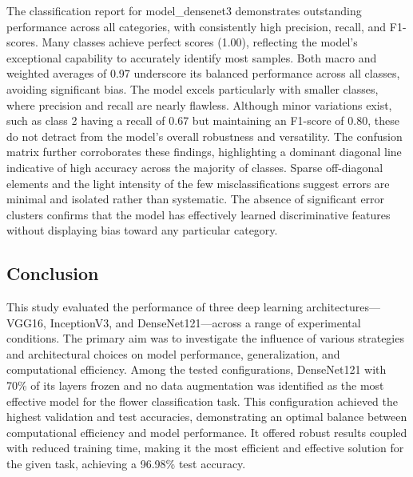 The classification report for model\_densenet3 demonstrates outstanding performance across all categories, with
consistently high precision, recall, and F1-scores. Many classes achieve perfect scores (1.00), reflecting the model's
exceptional capability to accurately identify most samples. Both macro and weighted averages of 0.97 underscore its
balanced performance across all classes, avoiding significant bias. The model excels particularly with smaller classes,
where precision and recall are nearly flawless. Although minor variations exist, such as class 2 having a recall of 0.67
but maintaining an F1-score of 0.80, these do not detract from the model's overall robustness and versatility.
The confusion matrix further corroborates these findings, highlighting a dominant diagonal line indicative of high
accuracy across the majority of classes. Sparse off-diagonal elements and the light intensity of the few misclassifications
suggest errors are minimal and isolated rather than systematic. The absence of significant error clusters confirms that
the model has effectively learned discriminative features without displaying bias toward any particular category.


\subsection{Conclusion}

This study evaluated the performance of three deep learning architectures—VGG16, InceptionV3, and DenseNet121—across
a range of experimental conditions. The primary aim was to investigate the influence of various strategies and
architectural choices on model performance, generalization, and computational efficiency. Among the tested configurations,
DenseNet121 with 70\% of its layers frozen and no data augmentation was identified as the most effective model
for the flower classification task. This configuration achieved the highest validation and test accuracies, demonstrating
an optimal balance between computational efficiency and model performance. It offered robust results coupled with
reduced training time, making it the most efficient and effective solution for the given task, achieving a 96.98\% test accuracy.


